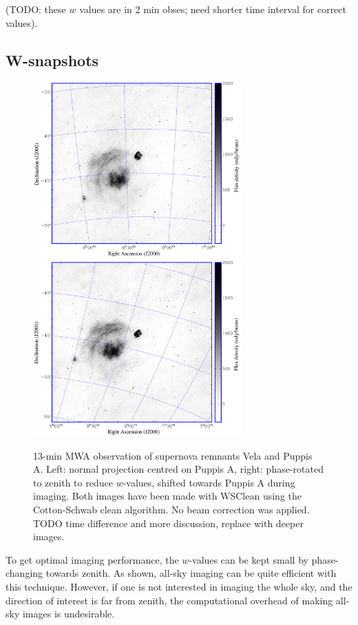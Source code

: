 \documentclass[useAMS,usenatbib]{mn2e}
\begin{document}
(TODO: these $w$ values are in 2 min obses; need shorter time interval for correct values).

\subsection{W-snapshots} \label{sec:snapshot-imaging}
\begin{figure}
\begin{center}
\includegraphics[width=8cm]{img/vela-normal-projection}
\includegraphics[width=8cm]{img/vela-zenith-projection}
\caption{13-min MWA observation of supernova remnants Vela and Puppis A. Left: normal projection centred on Puppis A, right: phase-rotated to zenith to reduce $w$-values, shifted towards Puppis A during imaging. Both images have been made with WSClean using the Cotton-Schwab clean algorithm. No beam correction was applied. TODO time difference and more discussion, replace with deeper images.}
\label{fig:vela-projection-example}
\end{center}
\end{figure}
To get optimal imaging performance, the $w$-values can be kept small by phase-changing towards zenith. As shown, all-sky imaging can be quite efficient with this technique. However, if one is not interested in imaging the whole sky, and the direction of interest is far from zenith, the computational overhead of making all-sky images is undesirable.
\end{document}
